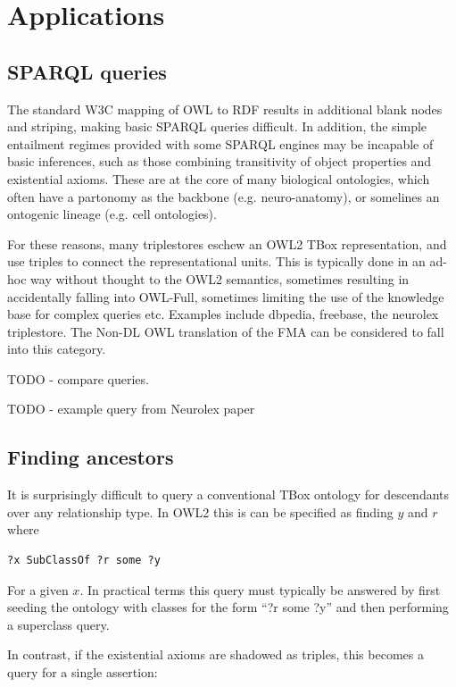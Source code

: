 \documentclass{my}
\begin{document}
\section{Applications}

\subsection{SPARQL queries}

The standard W3C mapping of OWL to RDF results in additional blank
nodes and striping, making basic SPARQL queries difficult. In
addition, the simple entailment regimes provided with some SPARQL
engines may be incapable of basic inferences, such as those combining
transitivity of object properties and existential axioms. These are at
the core of many biological ontologies, which often have a partonomy
as the backbone (e.g. neuro-anatomy), or somelines an ontogenic
lineage (e.g. cell ontologies).

For these reasons, many triplestores eschew an OWL2 TBox
representation, and use triples to connect the representational
units. This is typically done in an ad-hoc way without thought to the
OWL2 semantics, sometimes resulting in accidentally falling into
OWL-Full, sometimes limiting the use of the knowledge base for complex
queries etc. Examples include dbpedia, freebase, the neurolex
triplestore. The Non-DL OWL translation of the FMA can be considered
to fall into this category.

TODO - compare queries.

TODO - example query from Neurolex paper

\subsection{Finding ancestors}

It is surprisingly difficult to query a conventional TBox ontology for
descendants over any relationship type. In OWL2 this is can be
specified as finding $y$ and $r$ where

\begin{verbatim}
?x SubClassOf ?r some ?y
\end{verbatim}

For a given $x$. In practical terms this query must typically be
answered by first seeding the ontology with classes for the form ``?r
some ?y'' and then performing a superclass query.

In contrast, if the existential axioms are shadowed as triples, this
becomes a query for a single assertion:
\end{document}
